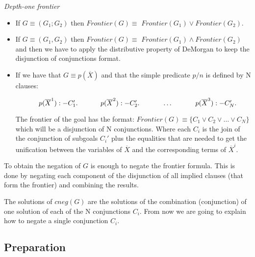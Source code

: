 \documentclass{llncs}
\begin{document}
\begin{definition}{\em Depth-one frontier}

    \begin{itemize} 

\item If $G \equiv (G_1;G_2) $ then $Frontier(G) \equiv$
$Frontier(G_1) \vee Frontier(G_2)$.

\item If $G \equiv (G_1,G_2) $ then $Frontier(G) \equiv$
  $Frontier(G_1) \wedge Frontier(G_2)$ and then we have to apply the
  distributive property of DeMorgan to keep the disjunction of
  conjunctions format.
  
\item If we have that $G \equiv p( \overline{X}) $ and that the simple
  predicate $p/n$ is defined by N clauses:

$
~~~~~~~~~~p( \overline{X}^1):- C_1'. \\
~~~~~~~~~~p( \overline{X}^2):- C_2'. \\
~~~~~~~~~~\ldots \\
~~~~~~~~~~p( \overline{X}^3):- C_N'. \\
$

The frontier of the goal has the format:
$Frontier(G) \equiv \{C_1 \vee C_2 \vee \ldots \vee C_N\}$ which
will be a disjunction of N conjunctions. Where each $C_i$ is the join
of the conjunction of subgoals $C_i'$ plus the equalities that are
needed to get the unification between the variables of $\overline{X}$
and the corresponding terms of $\overline{X}^i$.

    \end{itemize}

\end{definition}

To obtain the negation of $G$ is enough to negate the frontier
formula. This is done by negating each component of the disjunction of
all implied clauses (that form the frontier) and combining the
results.


The solutions of $cneg(G)$ are the solutions of the combination
(conjunction) of one solution of each of the N conjunctions
$C_i$. From now we are going to explain how to negate a single
conjunction $C_i$.




\subsection{Preparation}
\label{preparation}
\end{document}
